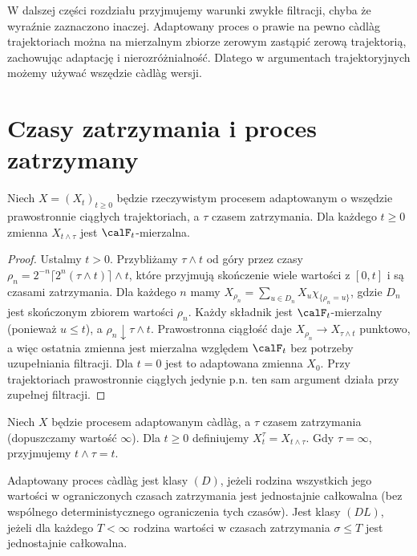 W dalszej części rozdziału przyjmujemy warunki zwykłe
filtracji, chyba że wyraźnie zaznaczono inaczej.
Adaptowany proces o prawie na pewno c\`adl\`ag
trajektoriach można na mierzalnym zbiorze zerowym
zastąpić zerową trajektorią, zachowując adaptację
i nierozróżnialność. Dlatego w argumentach
trajektoryjnych możemy używać wszędzie c\`adl\`ag
wersji.

\section{Czasy zatrzymania i proces zatrzymany}

\begin{lemat}
Niech $X=(X_t)_{t\ge0}$ będzie rzeczywistym procesem adaptowanym
o wszędzie prawostronnie ciągłych trajektoriach, a $\tau$ czasem zatrzymania.
Dla każdego $t\ge0$ zmienna $X_{t\wedge\tau}$ jest $\calF_t$-mierzalna.
\end{lemat}
\begin{proof}
Ustalmy $t>0$. Przybliżamy $\tau\wedge t$ od góry przez czasy
$\rho_n=2^{-n}\lceil2^n(\tau\wedge t)\rceil\wedge t$, które
przyjmują skończenie wiele wartości z $[0,t]$ i są czasami
zatrzymania. Dla każdego $n$ mamy
$X_{\rho_n}=\sum_{u\in D_n}X_u\chi_{\{\rho_n=u\}}$,
gdzie $D_n$ jest skończonym zbiorem wartości $\rho_n$.
Każdy składnik jest $\calF_t$-mierzalny (ponieważ $u\le t$),
a $\rho_n\downarrow\tau\wedge t$. Prawostronna ciągłość daje
$X_{\rho_n}\to X_{\tau\wedge t}$ punktowo, a więc
ostatnia zmienna jest mierzalna względem $\calF_t$
bez potrzeby uzupełniania filtracji.
Dla $t=0$ jest to adaptowana zmienna $X_0$.
Przy trajektoriach prawostronnie ciągłych jedynie
p.n. ten sam argument działa przy zupełnej filtracji.
\end{proof}


\begin{definicja}
Niech $X$ będzie procesem adaptowanym c\`adl\`ag,
a $\tau$ czasem zatrzymania (dopuszczamy wartość $\infty$).
Dla $t\ge0$ definiujemy $X_t^\tau=X_{t\wedge\tau}$.
Gdy $\tau=\infty$, przyjmujemy $t\wedge\tau=t$.
\end{definicja}

\begin{definicja}[Klasy $(D)$ i $(DL)$]
Adaptowany proces c\`adl\`ag jest klasy $(D)$,
jeżeli rodzina wszystkich jego wartości w
ograniczonych czasach zatrzymania jest jednostajnie
całkowalna (bez wspólnego deterministycznego
ograniczenia tych czasów).
Jest klasy $(DL)$, jeżeli dla każdego $T<\infty$
rodzina wartości w czasach zatrzymania $\sigma\le T$
jest jednostajnie całkowalna.
\end{definicja}

